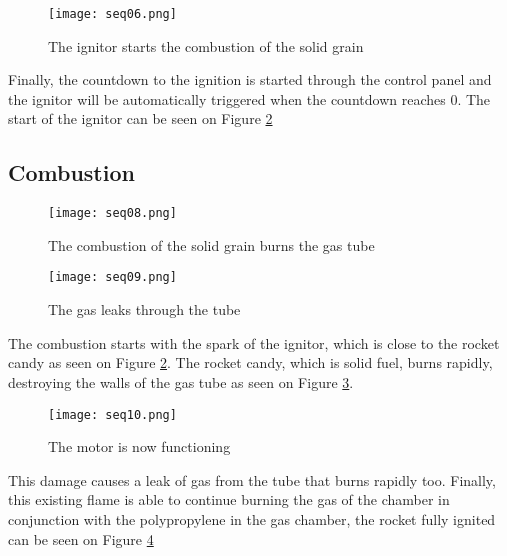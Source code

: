 \begin{figure}[h]
  \centering
  \texttt{[image: seq06.png]}
  \caption{The ignitor starts the combustion of the solid grain}
  \label{fig:startSolidBurnMotor}
\end{figure}

Finally, the countdown to the ignition is started through the control panel and the ignitor will be automatically triggered when the countdown reaches 0. The start of the ignitor can be seen on Figure \ref{fig:solidBurningMotor}

\subsection*{Combustion}

\begin{figure}[h]
  \centering
  \texttt{[image: seq08.png]}
  \caption{The combustion of the solid grain burns the gas tube}
  \label{fig:solidBurningMotor}
\end{figure}

\begin{figure}[h]
  \centering
  \texttt{[image: seq09.png]}
  \caption{The gas leaks through the tube}
  \label{fig:gasLeakingMotor}
\end{figure}

The combustion starts with the spark of the ignitor, which is close to the rocket candy as seen on Figure \ref{fig:solidBurningMotor}. The rocket candy, which is solid fuel, burns rapidly, destroying the walls of the gas tube as seen on Figure \ref{fig:gasLeakingMotor}.

\begin{figure}[H]
  \centering
  \texttt{[image: seq10.png]}
  \caption{The motor is now functioning}
  \label{fig:functioningMotor}
\end{figure}

This damage causes a leak of gas from the tube that burns rapidly too. Finally, this existing flame is able to continue burning the gas of the chamber in conjunction with the polypropylene in the gas chamber, the rocket fully ignited can be seen on Figure \ref{fig:functioningMotor}
